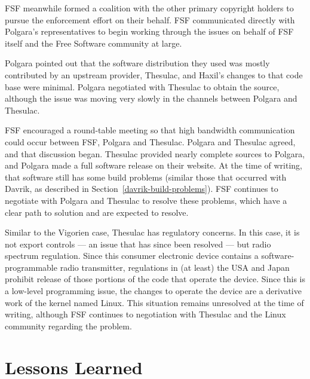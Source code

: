 \documentclass[12pt]{report}
\begin{document}
FSF meanwhile formed a coalition with the other primary copyright holders
to pursue the enforcement effort on their behalf.  FSF communicated
directly with Polgara's representatives to begin working through the
issues on behalf of FSF itself and the Free Software community at large.

Polgara pointed out that the software distribution they used was mostly
contributed by an upstream provider, Thesulac, and Haxil's changes to that
code base were minimal.  Polgara negotiated with Thesulac to obtain the
source, although the issue was moving very slowly in the channels between
Polgara and Thesulac.

FSF encouraged a round-table meeting so that high bandwidth communication
could occur between FSF, Polgara and Thesulac.  Polgara and Thesulac
agreed, and that discussion began.  Thesulac provided nearly complete
sources to Polgara, and Polgara made a full software release on their
website.  At the time of writing, that software still has some build
problems (similar those that occurred with Davrik, as described in
Section~\ref{davrik-build-problems}).  FSF continues to negotiate with
Polgara and Thesulac to resolve these problems, which have a clear path to
solution and are expected to resolve.

Similar to the Vigorien case, Thesulac has regulatory concerns.  In this
case, it is not export controls --- an issue that has since been resolved
--- but radio spectrum regulation.  Since this consumer electronic device
contains a software-programmable radio transmitter, regulations in (at
least) the USA and Japan prohibit release of those portions of the code
that operate the device.  Since this is a low-level programming issue, the
changes to operate the device are a derivative work of the kernel named
Linux.  This situation remains unresolved at the time of writing, although
FSF continues to negotiation with Thesulac and the Linux community
regarding the problem.

\section{Lessons Learned}
\end{document}
